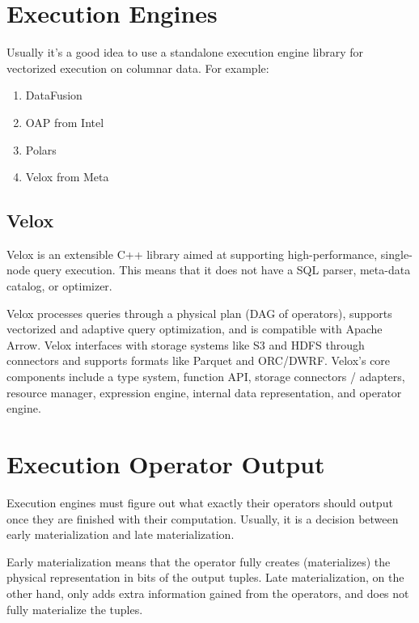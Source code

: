 \documentclass[11pt]{article}
\begin{document}
\section{Execution Engines}

Usually it's a good idea to use a standalone execution engine library for
vectorized execution on columnar data. For example:
\begin{enumerate}
    \item DataFusion
    \item OAP from Intel
    \item Polars
    \item Velox from Meta
\end{enumerate}

\subsection{Velox}

Velox \cite{velox} is an extensible C++ library aimed at supporting
high-performance, single-node query execution. This means that it does not have
a SQL parser, meta-data catalog, or optimizer.

Velox processes queries through a physical plan (DAG of operators), supports
vectorized and adaptive query optimization, and is compatible with Apache Arrow.
Velox interfaces with storage systems like S3 and HDFS through connectors and
supports formats like Parquet and ORC/DWRF. Velox's core components include a
type system, function API, storage connectors / adapters, resource manager,
expression engine, internal data representation, and operator engine.




\section{Execution Operator Output}

Execution engines must figure out what exactly their operators should output
once they are finished with their computation. Usually, it is a decision between
early materialization and late materialization.

Early materialization means that the operator fully creates (materializes) the
physical representation in bits of the output tuples. Late materialization,
on the other hand, only adds extra information gained from the operators,
and does not fully materialize the tuples.
\end{document}
